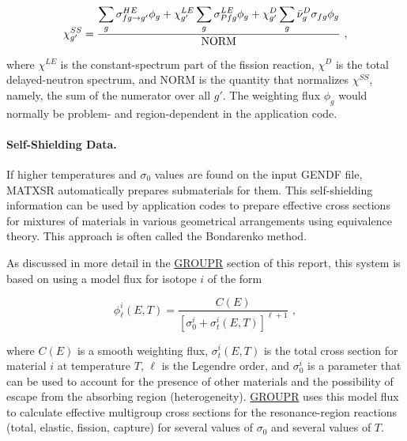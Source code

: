 \begin{equation}
   \chi^{SS}_{g'}= \frac{\displaystyle\sum_g\sigma^{HE}_{fg{\rightarrow}g'}
      \phi_g + \chi^{LE}_{g'}\sum_g\sigma^{LE}_{Pfg}\phi_g
       +\chi^D_{g'}\sum_g\bar{\nu}^D_g\sigma_{fg}\phi_g}
         {\rm NORM} \,\,,
\end{equation}
\vspace{0.5 pt}

\noindent
where $\chi^{LE}$ is the constant-spectrum part of the fission reaction,
$\chi^D$ is the total delayed-neutron spectrum, and NORM is the quantity
that normalizes $\chi^{SS}$, namely, the sum of the numerator over
all $g'$.  The weighting flux $\phi_g$ would normally be problem- and
region-dependent in the application code.

\paragraph{Self-Shielding Data.}
If higher temperatures and $\sigma_0$ values are found on the input GENDF
file, MATXSR automatically prepares
submaterials for them.  This
self-shielding information can be used by application codes to prepare
effective cross sections for mixtures of materials in various geometrical
arrangements using equivalence theory.  This approach is often called
the Bondarenko method\cite{Bondarenko}.

As discussed in more detail in the
\hyperlink{sGROUPRhy}{GROUPR} section of this report, this
system is based on using a model flux for isotope $i$ of the form

\begin{equation}
   \phi^i_\ell(E,T)=\frac{C(E)}{[\sigma^i_0+\sigma^i_t(E,T)]^{\ell+1}}\,\,,
\end{equation}
\vspace{0.5 pt}

\noindent
where $C(E)$ is a smooth weighting flux, $\sigma^i_t(E,T)$ is the total
cross section for material $i$ at temperature $T$, $\ell$ is the Legendre
order, and $\sigma^i_0$ is a parameter that can be used to account for
the presence of other materials and the possibility of escape from the
absorbing region (heterogeneity).  \hyperlink{sGROUPRhy}{GROUPR}
uses this model flux to
calculate effective multigroup cross sections for the resonance-region
reactions (total, elastic, fission, capture) for several values of
$\sigma_0$ and several values of $T$.

